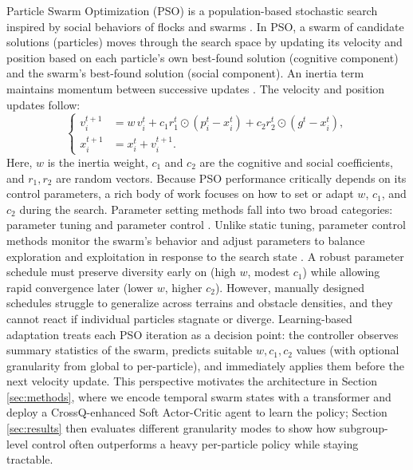 \documentclass[fleqn,10pt]{wlscirep}
\begin{document}
Particle Swarm Optimization (PSO) is a population-based stochastic search inspired by social behaviors of flocks and swarms \cite{kennedy1995pso}.
In PSO, a swarm of candidate solutions (particles) moves through the search space by updating its velocity and position based on each particle's own best-found solution (cognitive component) and the swarm's best-found solution (social component).
An inertia term maintains momentum between successive updates \cite{clerc2002stagnation}.
The velocity and position updates follow:
\begin{equation}
\left\{
\begin{aligned}
v_i^{t+1} &= w\,v_i^{t} + c_1 r_1^{t}\odot(p_i^{t}-x_i^{t}) + c_2 r_2^{t}\odot(g^{t}-x_i^{t}),\\
x_i^{t+1}&=x_i^{t}+v_i^{t+1}.
\end{aligned}
\right.
\end{equation}
Here, \(w\) is the inertia weight, \(c_1\) and \(c_2\) are the cognitive and social coefficients, and \(r_1,r_2\) are random vectors.
Because PSO performance critically depends on its control parameters, a rich body of work focuses on how to set or adapt \(w\), \(c_1\), and \(c_2\) during the search.
Parameter setting methods fall into two broad categories: parameter tuning and parameter control \cite{Eberhart2000parametercontrol}.
Unlike static tuning, parameter control methods monitor the swarm's behavior and adjust parameters to balance exploration and exploitation in response to the search state \cite{Nickabadi2011a}. 
A robust parameter schedule must preserve diversity early on (high \(w\), modest \(c_1\)) while allowing rapid convergence later (lower \(w\), higher \(c_2\)).
However, manually designed schedules struggle to generalize across terrains and obstacle densities, and they cannot react if individual particles stagnate or diverge.
Learning-based adaptation treats each PSO iteration as a decision point: the controller observes summary statistics of the swarm, predicts suitable \(w,c_1,c_2\) values (with optional granularity from global to per-particle), and immediately applies them before the next velocity update.
This perspective motivates the architecture in Section \ref{sec:methods}, where we encode temporal swarm states with a transformer and deploy a CrossQ-enhanced Soft Actor-Critic agent to learn the policy; Section \ref{sec:results} then evaluates different granularity modes to show how subgroup-level control often outperforms a heavy per-particle policy while staying tractable.
\end{document}

